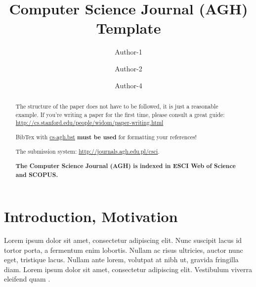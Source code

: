 \documentclass[10pt]{article}
\begin{document}
\begin{opening}

\title{Computer Science Journal (AGH) Template}

\author[Institution, address, the first author's e-mail address]{Author-1}

\author[Institution, address, the second author's e-mail address]{Author-2}

\author[Institution1, address1, the fourth author's e-mail address1
        Institution2, address2, the fourth author's e-mail address2,]{Author-4}

\begin{abstract}
The structure of the paper does not have to be followed, it is just
a reasonable example. If you're writing a paper for the first time, please consult a great guide: \url{http://cs.stanford.edu/people/widom/paper-writing.html}\vspace{1em}

\noindent BibTex with \url{cs-agh.bst} \textbf{must be used} for formatting your references!\vspace{1em}

\noindent The submission system: \url{http://journals.agh.edu.pl/csci}.\vspace{1em}

\noindent \textbf{The Computer Science Journal (AGH) is indexed in ESCI Web of Science and SCOPUS.}\vspace{1em}

\end{abstract}




\end{opening}

\section{Introduction, Motivation}

Lorem ipsum dolor sit amet, consectetur adipiscing elit. Nunc suscipit lacus id tortor porta, a fermentum enim lobortis. Nullam ac risus ultricies, auctor nunc eget, tristique lacus. Nullam ante lorem, volutpat at nibh ut, gravida fringilla diam. Lorem ipsum dolor sit amet, consectetur adipiscing elit. Vestibulum viverra eleifend quam \cite{RAGNARSSON2011457}.
\end{document}
